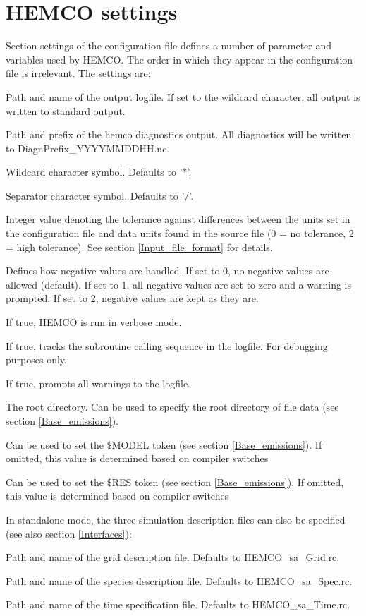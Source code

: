 \documentclass[12pt,a4paper]{article} %
\begin{document}
\section{HEMCO settings} \label{Settings}
Section settings of the configuration file defines a number of parameter and variables used by HEMCO. The order in which they appear in the configuration file is irrelevant. The settings are:
\begin{description} \itemsep0pt
\item [Logfile] Path and name of the output logfile. If set to the wildcard character, all output is written to standard output.
\item [DiagnPrefix] Path and prefix of the hemco diagnostics output. All diagnostics will be written to DiagnPrefix\_YYYYMMDDHH.nc.
\item [Wildcard] Wildcard character symbol. Defaults to '*'.
\item [Separator] Separator character symbol. Defaults to '/'.
\item [Unit tolerance] Integer value denoting the tolerance against differences between the units set in the configuration file and data units found in the source file (0 = no tolerance, 2 = high tolerance). See section \ref{Input_file_format} for details.
\item [Negative values] Defines how negative values are handled. If set to 0, no negative values are allowed (default). If set to 1, all negative values are set to zero and a warning is prompted. If set to 2, negative values are kept as they are.
\item [Verbose] If true, HEMCO is run in verbose mode.
\item [Track code] If true, tracks the subroutine calling sequence in the logfile. For debugging purposes only.
\item [Show warnings] If true, prompts all warnings to the logfile.
\item [ROOT] The root directory. Can be used to specify the root directory of file data (see section \ref{Base_emissions}).
\item [MODEL] Can be used to set the \$MODEL token (see section \ref{Base_emissions}). If omitted, this value is determined based on compiler switches
\item [RES] Can be used to set the \$RES token (see section \ref{Base_emissions}). If omitted, this value is determined based on compiler switches
\end{description}
In standalone mode, the three simulation description files can also be specified (see also section \ref{Interfaces}):
\begin{description} \itemsep0pt
\item [GridFile] Path and name of the grid description file. Defaults to HEMCO\_sa\_Grid.rc.
\item [SpecFile] Path and name of the species description file. Defaults to HEMCO\_sa\_Spec.rc.
\item [TimeFile] Path and name of the time specification file. Defaults to HEMCO\_sa\_Time.rc.
\end{description}
\end{document}
